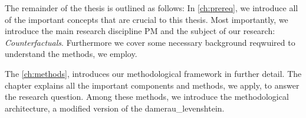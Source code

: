\documentclass[./../../paper.tex]{subfiles}
\begin{document}
    The remainder of the thesis is outlined as follows: In \autoref{ch:prereq}, we introduce all of the important concepts that are crucial to this thesis. Most importantly, we introduce the main research discipline \Gls{PM} and the subject of our research: \emph{Counterfactuals}. Furthermore we cover some necessary background reqwuired to understand the methods, we employ.
    
    
    



    

    The \autoref{ch:methods}, introduces our methodological framework in further detail. The chapter explains all the important components and methods, we apply, to answer the research question. Among these methods, we introduce the methodological architecture, a modified version of the \Gls{damerau_levenshtein}.
\end{document}
